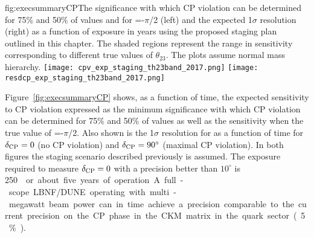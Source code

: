 \begin{dunefigure}{fig:execsummaryCP}{The
    significance with which CP violation can be determined for 75\% and 50\% of
    \deltacp values and for \deltacp=-$\pi$/2 (left) and the expected 1$\sigma$ resolution
    (right) as a function of exposure in years using the proposed
    staging plan outlined in this chapter. The shaded regions
    represent the range in sensitivity corresponding to
    different true values of $\theta_{23}$. The plots assume normal mass hierarchy.}
\texttt{[image: cpv\_exp\_staging\_th23band\_2017.png]}
 \texttt{[image: resdcp\_exp\_staging\_th23band\_2017.png]}
\end{dunefigure}
%
Figure~\ref{fig:execsummaryCP} shows, as a function of time, the
expected sensitivity to CP violation expressed as the minimum significance
with which CP violation can be determined for 75\% and 50\% of
\deltacp values as well as the sensitivity when the true value of \deltacp=-$\pi$/2.
Also shown is the 1$\sigma$ resolution for \deltacp as a
function of time for $\delta_{\rm CP}=0$ (no CP violation) and
$\delta_{\rm CP}=90^\circ$ (maximal CP violation). In both figures the staging scenario
described previously is assumed.  The exposure required to measure
$\delta_{\rm CP} = 0 $ with a precision better than $10^\circ$ is \SI{250}~\ktMWyr{} or about five years of operation. A full-scope LBNF/DUNE operating with 
multi-megawatt 
beam power can in time achieve a precision 
comparable to the current precision on the CP phase in the
CKM matrix in the quark sector (5\%).

